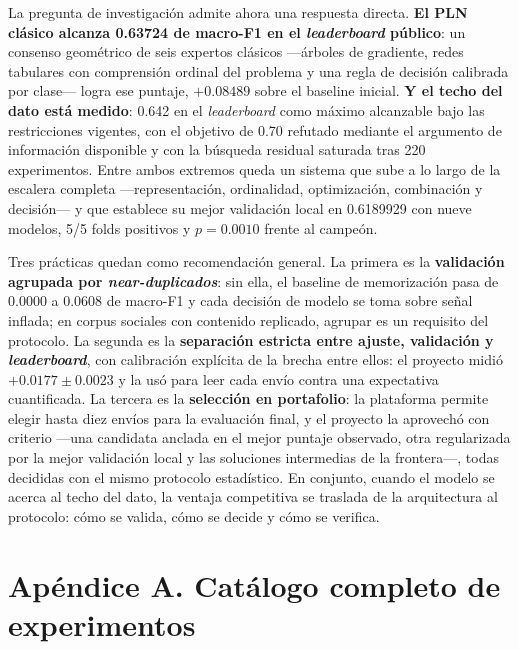 \documentclass[journal]{IEEEtai}
\begin{document}
La pregunta de investigaci\'on admite ahora una respuesta directa. \textbf{El PLN cl\'asico alcanza 0.63724 de macro-F1 en el \textit{leaderboard} p\'ublico}: un consenso geom\'etrico de seis expertos cl\'asicos ---\'arboles de gradiente, redes tabulares con comprensi\'on ordinal del problema y una regla de decisi\'on calibrada por clase--- logra ese puntaje, $+0.08489$ sobre el baseline inicial. \textbf{Y el techo del dato est\'a medido}: 0.642 en el \textit{leaderboard} como m\'aximo alcanzable bajo las restricciones vigentes, con el objetivo de 0.70 refutado mediante el argumento de informaci\'on disponible y con la b\'usqueda residual saturada tras 220 experimentos. Entre ambos extremos queda un sistema que sube a lo largo de la escalera completa ---representaci\'on, ordinalidad, optimizaci\'on, combinaci\'on y decisi\'on--- y que establece su mejor validaci\'on local en 0.6189929 con nueve modelos, 5/5 folds positivos y $p = 0.0010$ frente al campe\'on.

Tres pr\'acticas quedan como recomendaci\'on general. La primera es la \textbf{validaci\'on agrupada por \textit{near-duplicados}}: sin ella, el baseline de memorizaci\'on pasa de 0.0000 a 0.0608 de macro-F1 y cada decisi\'on de modelo se toma sobre se\~nal inflada; en corpus sociales con contenido replicado, agrupar es un requisito del protocolo. La segunda es la \textbf{separaci\'on estricta entre ajuste, validaci\'on y \textit{leaderboard}}, con calibraci\'on expl\'icita de la brecha entre ellos: el proyecto midi\'o $+0.0177 \pm 0.0023$ y la us\'o para leer cada env\'io contra una expectativa cuantificada. La tercera es la \textbf{selecci\'on en portafolio}: la plataforma permite elegir hasta diez env\'ios para la evaluaci\'on final, y el proyecto la aprovech\'o con criterio ---una candidata anclada en el mejor puntaje observado, otra regularizada por la mejor validaci\'on local y las soluciones intermedias de la frontera---, todas decididas con el mismo protocolo estad\'istico. En conjunto, cuando el modelo se acerca al techo del dato, la ventaja competitiva se traslada de la arquitectura al protocolo: c\'omo se valida, c\'omo se decide y c\'omo se verifica.

\section*{Ap\'endice A. Cat\'alogo completo de experimentos}
{}
\renewcommand{\theapendicecatalogo}{A}
\label{ap:catalogo}
\begingroup\raggedright
\end{document}
